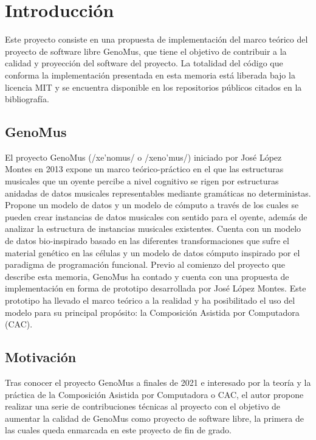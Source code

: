 \chapter{Introducción}

Este proyecto consiste en una propuesta de implementación del marco teórico del proyecto de software libre GenoMus\cite{GenoMus}, que tiene el objetivo de contribuir a la calidad y proyección del software del proyecto. La totalidad del código que conforma la implementación presentada en esta memoria está liberada bajo la licencia MIT\cite{mit} y se encuentra disponible en los repositorios públicos citados en la bibliografía.

\section{GenoMus}

El proyecto GenoMus (\textsf{/xe'nomus/} o \textsf{/xeno'mus/}) iniciado por José López Montes en 2013 expone un marco teórico-práctico en el que las estructuras musicales que un oyente percibe a nivel cognitivo se rigen por estructuras anidadas de datos musicales representables mediante gramáticas no deterministas. Propone un modelo de datos y un modelo de cómputo a través de los cuales se pueden crear instancias de datos musicales con sentido para el oyente, además de analizar la estructura de instancias musicales existentes. Cuenta con un modelo de datos bio-inspirado basado en las diferentes transformaciones que sufre el material genético en las células y un modelo de datos cómputo inspirado por el paradigma de programación funcional. Previo al comienzo del proyecto que describe esta memoria, GenoMus ha contado y cuenta con una propuesta de implementación en forma de prototipo\cite{GenoMus} desarrollada por José López Montes. Este prototipo ha llevado el marco teórico a la realidad y ha posibilitado el uso del modelo para su principal propósito: la Composición Asistida por Computadora (CAC).

\section{Motivación}\label{motivacion}

Tras conocer el proyecto GenoMus a finales de 2021 e interesado por la teoría y la práctica de la Composición Asistida por Computadora o CAC, el autor propone realizar una serie de contribuciones técnicas al proyecto con el objetivo de aumentar la calidad de GenoMus como proyecto de software libre, la primera de las cuales queda enmarcada en este proyecto de fin de grado.
